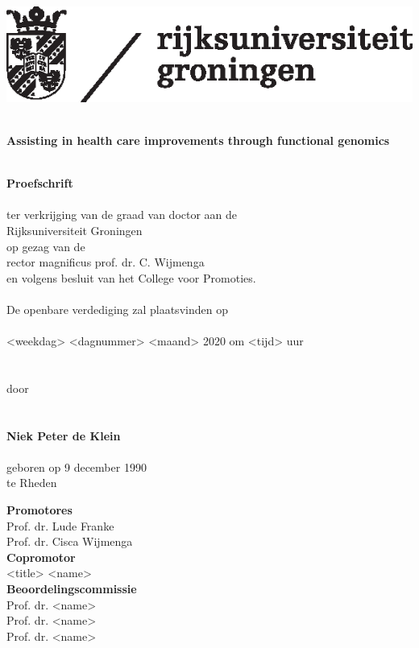 \begin{flushleft}
\includegraphics[scale=0.8]{img/rugr_logonl_zwart_cmyk}
\end{flushleft}

\begin{center}
\linespread{1.00} %
~\\
\huge
\textbf{Assisting in health care improvements through functional genomics}
\\~\\
\linespread{1.05} %


\large
\textbf{Proefschrift}
\\~\\
\normalsize
ter verkrijging van de graad van doctor aan de\\
Rijksuniversiteit Groningen\\
op gezag van de\\
rector magnificus prof. dr. C. Wijmenga\\
en volgens besluit van het College voor Promoties.
\\~\\
De openbare verdediging zal plaatsvinden op
\\~\\
<weekdag> <dagnummer> <maand> 2020 om <tijd> uur 
\\~\\~\\
door
\\~\\~\\
\large
\textbf{Niek Peter de Klein}
\\~\\
\normalsize
geboren op 9 december 1990\\
te Rheden\\
\normalsize
\end{center}

\clearpage

\noindent
\textbf{Promotores}\\
Prof. dr. Lude Franke\\
Prof. dr. Cisca Wijmenga\\

\noindent
\textbf{Copromotor}\\
<title> <name>\\

\noindent
\textbf{Beoordelingscommissie}\\
Prof. dr. <name>\\
Prof. dr. <name>\\
Prof. dr. <name>\\
